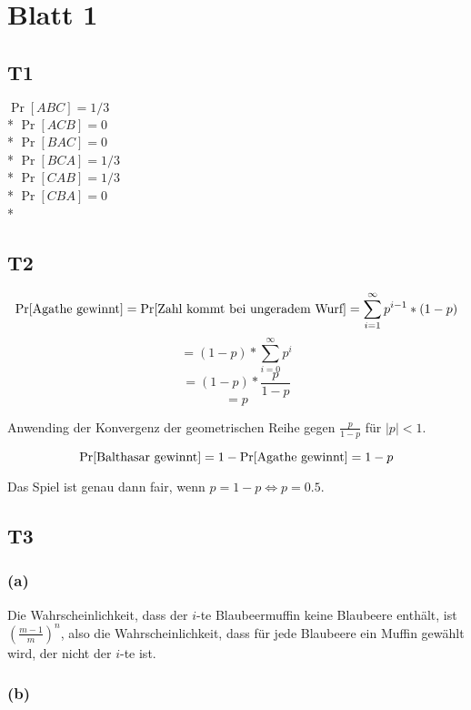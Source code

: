 \documentclass{article}
\begin{document}
\section*{Blatt 1}

\subsection*{T1}

$ \Pr[ABC]=1/3 $ \\*
$ \Pr[ACB]=0 $ \\*
$ \Pr[BAC]=0 $ \\*
$ \Pr[BCA]=1/3 $ \\*
$ \Pr[CAB]=1/3 $ \\*
$ \Pr[CBA]=0 $ \\*

\subsection*{T2}

$$ \Pr[\hbox{Agathe gewinnt}]=\Pr[\hbox{Zahl kommt bei ungeradem Wurf}]=\sum_{i=1}^{\infty} p^{i-1}*(1-p) $$
$$ =(1-p)*\sum_{i=0}^{\infty} p^i $$
$$ =(1-p)*\frac{p}{1-p} $$
$$ =p $$

Anwending der Konvergenz der geometrischen Reihe gegen $\frac{p}{1-p}$ für $|p|<1$.

$$ \Pr[\hbox{Balthasar gewinnt}]=1-\Pr[\hbox{Agathe gewinnt}]=1-p $$

Das Spiel ist genau dann fair, wenn $p=1-p \Leftrightarrow p=0.5$.

\subsection*{T3}

\subsubsection*{(a)}

Die Wahrscheinlichkeit, dass der $i$-te Blaubeermuffin keine Blaubeere
enthält, ist $(\frac{m-1}{m})^n$, also die Wahrscheinlichkeit, dass
für jede Blaubeere ein Muffin gewählt wird, der nicht der $i$-te ist.

\subsubsection*{(b)}

\end{document}

